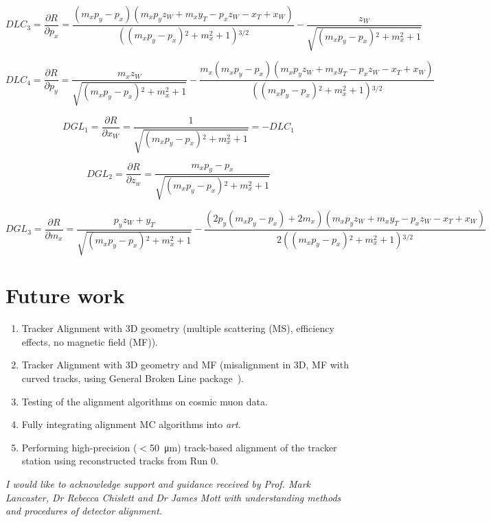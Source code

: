 \documentclass[a4paper,11pt]{article}
\def\art{{\it art}}
\begin{document}
\begin{equation}
DLC_3 = \frac{ \partial R}{\partial p_x} = \frac{\left(m_x p_y-p_x\right) \left(m_x p_y z_W+m_x y_T-p_x z_W-x_T+x_W\right)}{\left(\left(m_x p_y-p_x\right){}^2+m_x^2+1\right){}^{3/2}}-\frac{z_W}{\sqrt{\left(m_x p_y-p_x\right){}^2+m_x^2+1}}
\end{equation}

\begin{equation}
DLC_4 = \frac{ \partial R}{\partial p_y} = \frac{m_x z_W}{\sqrt{\left(m_x p_y-p_x\right){}^2+m_x^2+1}}-\frac{m_x \left(m_x p_y-p_x\right) \left(m_x p_y z_W+m_x y_T-p_x z_W-x_T+x_W\right)}{\left(\left(m_x p_y-p_x\right){}^2+m_x^2+1\right){}^{3/2}}
\end{equation}


\begin{equation}	
DGL_1 = \frac{\partial R}{\partial x_W} = \frac{1}{\sqrt{\left(m_x p_y-p_x\right){}^2+m_x^2+1}} = - DLC_1
\end{equation}

\begin{equation}	
DGL_2 = \frac{\partial R}{\partial z_w} = \frac{m_x p_y-p_x}{\sqrt{\left(m_x p_y-p_x\right){}^2+m_x^2+1}}
\end{equation}

\begin{equation}	
DGL_3 = \frac{\partial R}{\partial m_x} = \frac{p_y z_W+y_T}{\sqrt{\left(m_x p_y-p_x\right){}^2+m_x^2+1}}-\frac{\left(2 p_y \left(m_x p_y-p_x\right)+2 m_x\right) \left(m_x p_y z_W+m_x y_T-p_x z_W-x_T+x_W\right)}{2 \left(\left(m_x p_y-p_x\right){}^2+m_x^2+1\right){}^{3/2}}
\end{equation}

\section{Future work}\label{sec:future}
\vspace{-0.2cm}
\vspace{-0.2cm}
\begin{enumerate}
	\setlength\itemsep{-0.5em}
	\item Tracker Alignment with 3D geometry (multiple scattering (MS), efficiency effects, no magnetic field (MF)).
	\item Tracker Alignment with 3D geometry and MF (misalignment in 3D, MF with curved tracks, using General Broken Line package~\cite{GBL}).
	\item Testing of the alignment algorithms on cosmic muon data.
	\item Fully integrating alignment MC algorithms into \art.
	\item Performing high-precision ($<$\SI{50}{\micro\metre}) track-based alignment of the tracker station using reconstructed tracks from Run 0.
\end{enumerate}
\vspace{-0.2cm}
\textit{I would like to acknowledge support and guidance received by Prof. Mark Lancaster, Dr Rebecca Chislett and Dr James Mott with understanding methods and procedures of detector alignment.}
\clearpage
\end{document}
